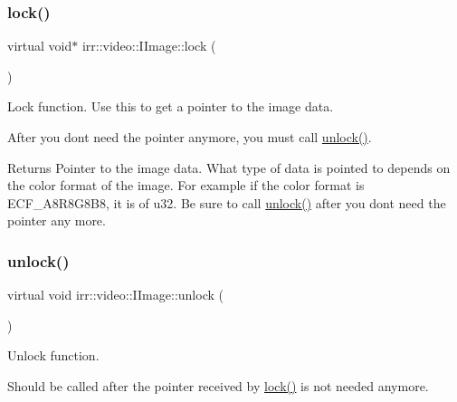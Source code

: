 \subsubsection{\texorpdfstring{lock()}{lock()}\hspace{0.1cm}{\footnotesize\ttfamily [2/2]}}
{\footnotesize\ttfamily virtual void$\ast$ irr\+::video\+::\+I\+Image\+::lock (\begin{DoxyParamCaption}{ }\end{DoxyParamCaption})\hspace{0.3cm}{\ttfamily [pure virtual]}}



Lock function. Use this to get a pointer to the image data. 

After you don\textquotesingle{}t need the pointer anymore, you must call \hyperlink{classirr_1_1video_1_1IImage_ad0f902d74a948ee66be2d70dc90ed38d}{unlock()}. \begin{DoxyReturn}{Returns}
Pointer to the image data. What type of data is pointed to depends on the color format of the image. For example if the color format is E\+C\+F\+\_\+\+A8\+R8\+G8\+B8, it is of u32. Be sure to call \hyperlink{classirr_1_1video_1_1IImage_ad0f902d74a948ee66be2d70dc90ed38d}{unlock()} after you don\textquotesingle{}t need the pointer any more. 
\end{DoxyReturn}
\mbox{\label{classirr_1_1video_1_1IImage_ad0f902d74a948ee66be2d70dc90ed38d}} 
\subsubsection{\texorpdfstring{unlock()}{unlock()}\hspace{0.1cm}{\footnotesize\ttfamily [1/2]}}
{\footnotesize\ttfamily virtual void irr\+::video\+::\+I\+Image\+::unlock (\begin{DoxyParamCaption}{ }\end{DoxyParamCaption})\hspace{0.3cm}{\ttfamily [pure virtual]}}



Unlock function. 

Should be called after the pointer received by \hyperlink{classirr_1_1video_1_1IImage_a5c4b0b5fa2a5f253f93c1b038e20d204}{lock()} is not needed anymore. \mbox{\label{classirr_1_1video_1_1IImage_ad0f902d74a948ee66be2d70dc90ed38d}} 

